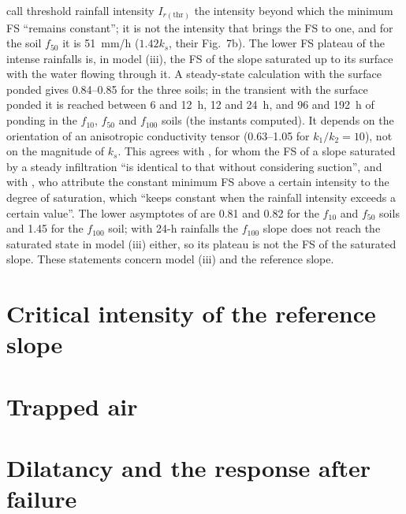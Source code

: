\documentclass[preprint,12pt,authoryear]{elsarticle}
\begin{document}
\citet[p.~1539]{rahardjo2007} call threshold rainfall intensity $I_{r(\mathrm{thr})}$ the intensity beyond which the
minimum FS ``remains constant''; it is not the intensity that brings the FS to one, and for the soil $f_{50}$ it is
51~mm/h ($1.42k_s$, their Fig.~7b). The lower FS plateau of the intense rainfalls is, in model (iii), the FS of the
slope saturated up to its surface with the water flowing through it. A steady-state calculation with the surface
ponded gives 0.84--0.85 for the three soils; in the transient with the surface ponded it is reached between 6 and
12~h, 12 and 24~h, and 96 and 192~h of ponding in the $f_{10}$, $f_{50}$ and $f_{100}$ soils (the instants computed).
It depends on the orientation of an anisotropic conductivity tensor (0.63--1.05 for $k_1/k_2=10$), not on the
magnitude of $k_s$. This agrees with \citet[p.~9]{li2024}, for whom the FS of a slope saturated by a steady
infiltration ``is identical to that without considering suction'', and with \citet[p.~17]{cheng2024}, who attribute
the constant minimum FS above a certain intensity to the degree of saturation, which ``keeps constant when the
rainfall intensity exceeds a certain value''. The lower asymptotes of \citet[Fig.~7]{rahardjo2007} are 0.81 and 0.82
for the $f_{10}$ and $f_{50}$ soils and 1.45 for the $f_{100}$ soil; with 24-h rainfalls the $f_{100}$ slope does not
reach the saturated state in model (iii) either, so its plateau is not the FS of the saturated slope. These
statements concern model (iii) and the reference slope.

\section{Critical intensity of the reference slope}\label{sec:decomp}



\section{Trapped air}\label{sec:ar}



\section{Dilatancy and the response after failure}\label{sec:dilat}
\end{document}
